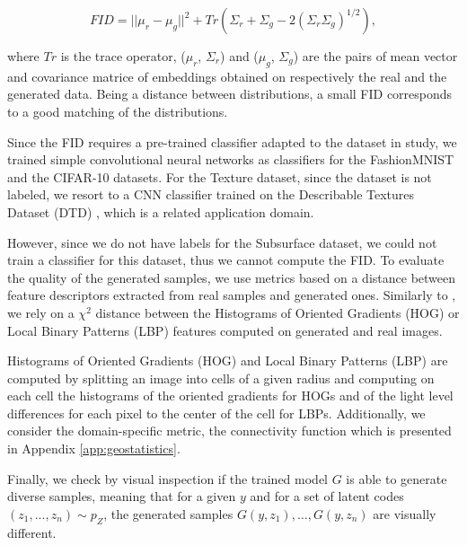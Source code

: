 \begin{equation}
FID = ||\mu_r - \mu_g||^2+Tr(\Sigma_r+\Sigma_g - 2(\Sigma_r\Sigma_g)^{1/2}),
\label{eq:fid}
\end{equation}

\noindent where $Tr$ is the trace operator, ($\mu_r$, $\Sigma_r$) and ($\mu_g$, $\Sigma_g$) are the pairs of mean vector and covariance matrice of embeddings obtained on respectively the real and the generated data. Being a distance between distributions,  a small FID corresponds to a good matching of the distributions.

Since the FID requires a pre-trained classifier adapted to the dataset in study, we trained simple convolutional neural networks as classifiers for the FashionMNIST and the CIFAR-10 datasets. For the Texture dataset, since the dataset is not labeled, we resort to a CNN classifier trained on the Describable Textures Dataset (DTD) \citep{Cimpoi14}, which is a related application domain.

However, since we do not have labels for the Subsurface dataset, we could not train a classifier for this dataset, thus we cannot compute the FID. To evaluate the quality of the generated samples, we use metrics based on a distance between feature descriptors extracted from real samples and generated ones. Similarly to \citep{Ruffino2019}, we rely on a $\chi^2$ distance between the Histograms of Oriented Gradients (HOG) or Local Binary Patterns (LBP) features computed on generated and real images. 

Histograms of Oriented Gradients (HOG) \citep{Dalal2005} and Local Binary Patterns (LBP) \citep{Pietikainen2011} are computed by splitting an image into cells of a given radius and computing on each cell the histograms of the oriented gradients for HOGs and of the light level differences for each pixel to the center of the cell for LBPs.  Additionally, we consider the domain-specific metric, the connectivity function \citep{Lemmens2017} which is presented in Appendix \ref{app:geostatistics}.

Finally, we check by visual inspection if the trained model $G$ is able to generate diverse samples, meaning that for a given $y$ and for a set of latent codes $(z_1, ..., z_n) \sim p_Z$, the generated samples $G(y,z_1), \ldots, G(y, z_n)$ are visually different. 




